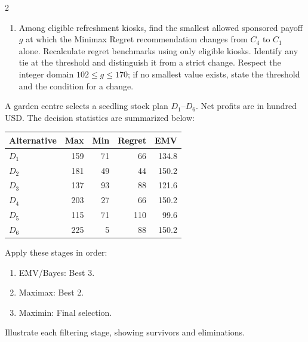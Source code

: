 \begin{multicols}{2}
\begin{enumerate}[label=\textbf{(\alph*)},leftmargin=*]
	\item Among eligible refreshment kiosks, find the smallest allowed sponsored payoff $g$ at which the Minimax Regret recommendation changes from $C_4$ to $C_1$ alone. Recalculate regret benchmarks using only eligible kiosks. Identify any tie at the threshold and distinguish it from a strict change. Respect the integer domain $102\leq g\leq170$; if no smallest value exists, state the threshold and the condition for a change. 
\end{enumerate}


\columnbreak
{}
A garden centre selects a seedling stock plan $D_1$--$D_6$. Net profits are in hundred USD. The decision statistics are summarized below:

\vspace{-3mm}
\begin{center}\small\setlength{\tabcolsep}{4pt}
	\begin{tabular}{lrrrr}\toprule
		Alternative & Max & Min & Regret & EMV\\ \midrule
		$D_1$ & 159 & 71 & 66 & 134.8\\
		$D_2$ & 181 & 49 & 44 & 150.2\\
		$D_3$ & 137 & 93 & 88 & 121.6\\
		$D_4$ & 203 & 27 & 66 & 150.2\\
		$D_5$ & 115 & 71 & 110 & 99.6\\
		$D_6$ & 225 & 5 & 88 & 150.2\\
		\bottomrule
	\end{tabular}
\end{center}
\vspace{-3mm}

Apply these stages in order:
\begin{enumerate}[leftmargin=*]
	\item EMV/Bayes: Best 3.
	\item Maximax: Best 2.
	\item Maximin: Final selection.
\end{enumerate}
Illustrate each filtering stage, showing survivors and eliminations.


\end{multicols}
\newpage
